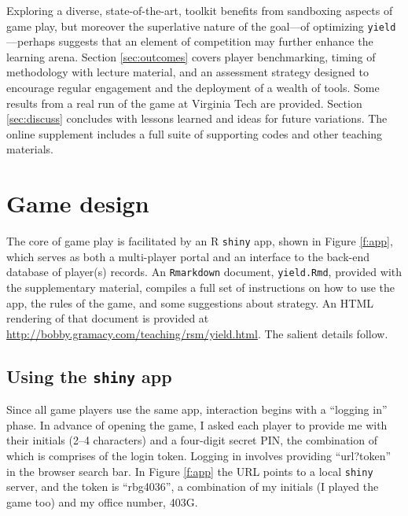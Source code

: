 \documentclass[12pt]{article}
\begin{document}
Exploring a diverse, state-of-the-art, toolkit benefits from sandboxing
aspects of game play, but moreover the superlative nature of the goal---of
optimizing {\tt yield}---perhaps suggests that an element of competition may
further enhance the learning arena.  Section \ref{sec:outcomes} covers player
benchmarking, timing of methodology with lecture material, and an assessment
strategy designed to encourage regular engagement and the deployment of a
wealth of tools.  Some results from a real run of the game at Virginia Tech
are provided.  Section \ref{sec:discuss} concludes with lessons learned and
ideas for future variations.  The online supplement includes a full suite of
supporting codes and other teaching materials.

\section{Game design}
\label{sec:game}

The core of game play is facilitated by an {\sf R} {\tt shiny} app, shown in
Figure \ref{f:app}, which serves as both a multi-player portal and an
interface to the back-end database of player(s) records.  An {\tt Rmarkdown}
document, {\tt yield.Rmd}, provided with the supplementary material, compiles
a full set of instructions on how to use the app, the rules of the game, and
some suggestions about strategy.  An HTML rendering of that document is
provided at \url{http://bobby.gramacy.com/teaching/rsm/yield.html}.  The
salient details follow.

\subsection{Using the {\tt shiny} app}

Since all game players use the same app, interaction begins with a ``logging
in'' phase.  In advance of opening the game, I asked each player to provide me
with their initials (2--4 characters) and a four-digit secret PIN, the
combination of which is comprises of the login token.  Logging in involves
providing ``url?token'' in the browser search bar.  In Figure \ref{f:app} the
URL points to a local {\tt shiny} server, and the token is ``rbg4036'', a
combination of my initials (I played the game too) and my office number, 403G.
\end{document}
